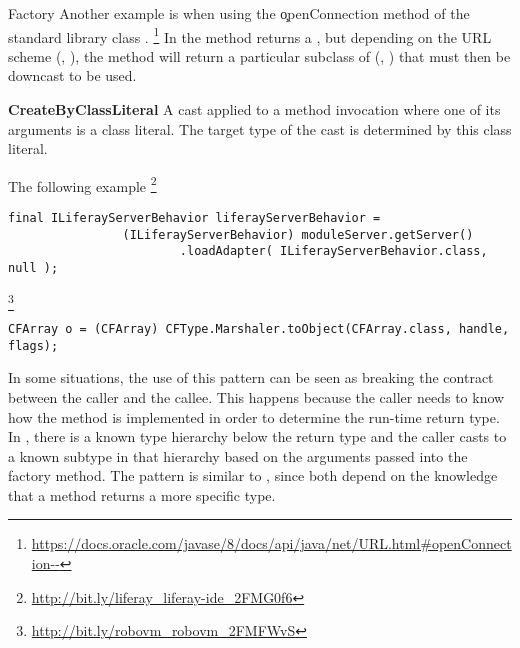 \begin{pattern}{Factory}
Another example is when using the \c{openConnection} method
of the standard library class .%
\footnote{\url{https://docs.oracle.com/javase/8/docs/api/java/net/URL.html\#openConnection--}}
In the method returns a , but depending on the URL scheme
(\eg, ), the method will return a particular subclass 
of  (\eg, )
that must then be downcast to be used.



\textbf{CreateByClassLiteral}
A cast applied to a method invocation where one of its arguments is a class literal.
The target type of the cast is determined by this class literal.

\instances{}
The following example 
\footnote{\url{http://bit.ly/liferay_liferay-ide_2FMG0f6}}

\begin{verbatim}
final ILiferayServerBehavior liferayServerBehavior =
                (ILiferayServerBehavior) moduleServer.getServer()
                        .loadAdapter( ILiferayServerBehavior.class, null );
\end{verbatim}


\footnote{\url{http://bit.ly/robovm_robovm_2FMFWvS}}

\begin{verbatim}
CFArray o = (CFArray) CFType.Marshaler.toObject(CFArray.class, handle, flags);
\end{verbatim} 





\discussion{}
In some situations, the use of this pattern can be seen as breaking the contract \api{} between the caller and the callee.
This happens because the caller needs to know how the method is implemented in order to determine the run-time return type.
  In \thisp{}, there is a known type hierarchy 
  below the return type and the caller casts to a known subtype
  in that hierarchy based on the arguments passed into the factory method.
%
The  pattern is similar to \thisp{},
since both depend on the knowledge that a method returns a more specific type.

\end{pattern}

